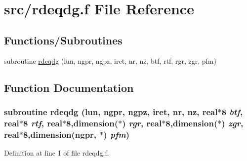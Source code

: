 \hypertarget{rdeqdg_8f}{
\section{src/rdeqdg.f File Reference}
\label{rdeqdg_8f}
}
\subsection*{Functions/Subroutines}
\begin{CompactItemize}
\item 
subroutine \hyperlink{rdeqdg_8f_cb140037f9a9e37e0d492c89d1917d71}{rdeqdg} (lun, ngpr, ngpz, iret, nr, nz, btf, rtf, rgr, zgr, pfm)
\end{CompactItemize}


\subsection{Function Documentation}
\hypertarget{rdeqdg_8f_cb140037f9a9e37e0d492c89d1917d71}{
\subsubsection[rdeqdg]{\setlength{\rightskip}{0pt plus 5cm}subroutine rdeqdg (lun, \/  ngpr, \/  ngpz, \/  iret, \/  nr, \/  nz, \/  real$\ast$8 {\em btf}, \/  real$\ast$8 {\em rtf}, \/  real$\ast$8,dimension($\ast$) {\em rgr}, \/  real$\ast$8,dimension($\ast$) {\em zgr}, \/  real$\ast$8,dimension(ngpr, $\ast$) {\em pfm})}}
\label{rdeqdg_8f_cb140037f9a9e37e0d492c89d1917d71}




Definition at line 1 of file rdeqdg.f.